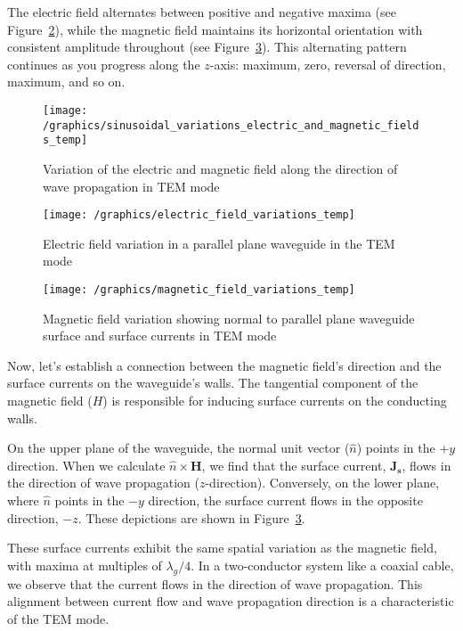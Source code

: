 The electric field alternates between positive and negative maxima (see Figure~\ref{fig:page702}), while the magnetic field maintains its horizontal orientation with consistent amplitude throughout (see Figure~\ref{fig:page703}). This alternating pattern continues as you progress along the \(z\)-axis: maximum, zero, reversal of direction, maximum, and so on.

\begin{figure}[h]
\centering
\texttt{[image: /graphics/sinusoidal\_variations\_electric\_and\_magnetic\_fields\_temp]}
\caption{Variation of the electric and magnetic field along the direction of wave propagation in TEM mode}
\label{fig:group4002}
\end{figure}
\begin{figure}[h]
\centering
\texttt{[image: /graphics/electric\_field\_variations\_temp]}
\caption{Electric field variation in a parallel plane waveguide in the TEM mode}
\label{fig:page702}
\end{figure}
\begin{figure}[h]
\centering
\texttt{[image: /graphics/magnetic\_field\_variations\_temp]}
\caption{Magnetic field variation showing normal to parallel plane waveguide surface and surface currents in TEM mode}
\label{fig:page703}
\end{figure}

Now, let's establish a connection between the magnetic field's direction and the surface currents on the waveguide's walls. The tangential component of the magnetic field (\(H\)) is responsible for inducing surface currents on the conducting walls.

On the upper plane of the waveguide, the normal unit vector (\(\hat{n}\)) points in the \(+y\) direction. When we calculate \(\hat{n} \times \boldsymbol{H}\), we find that the surface current, \(\boldsymbol{J_s}\), flows in the direction of wave propagation (\(z\)-direction). Conversely, on the lower plane, where \(\hat{n}\) points in the \(-y\) direction, the surface current flows in the opposite direction, \(-z\). These depictions are shown in Figure~\ref{fig:page703}.

These surface currents exhibit the same spatial variation as the magnetic field, with maxima at multiples of \(\lambda_g/4\). In a two-conductor system like a coaxial cable, we observe that the current flows in the direction of wave propagation. This alignment between current flow and wave propagation direction is a characteristic of the TEM mode.

